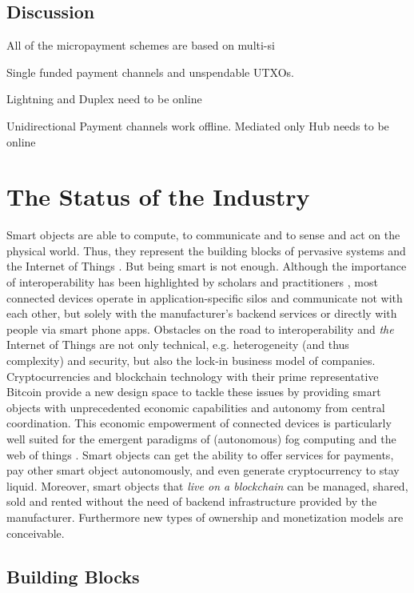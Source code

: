 \section{Discussion}

All of the micropayment schemes are based on multi-si

Single funded payment channels and unspendable UTXOs.

Lightning and Duplex need to be online 

Unidirectional Payment channels work offline. Mediated only Hub needs to be online 




\chapter{The Status of the Industry}
\label{sec:economy}

Smart objects are able to compute, to communicate and to sense and act on the physical world. Thus, they represent the building blocks of pervasive systems and the Internet of Things \cite{kortuem2010smart}. But being smart is not enough. Although the importance of interoperability has been highlighted by scholars \cite{zorzi2010} and practitioners \cite{manyika2015unlocking}, most connected devices operate in application-specific silos and communicate not with each other, but solely with the manufacturer's backend services or directly with people via smart phone apps.
Obstacles on the road to interoperability and \textit{the} Internet of Things are not only technical, e.g. heterogeneity (and thus complexity) and security, but also the lock-in business model of companies.
Cryptocurrencies and blockchain technology with their prime representative Bitcoin provide a new design space to tackle these issues by providing smart objects with unprecedented economic capabilities and autonomy from central coordination. This economic empowerment of connected devices is particularly well suited for the emergent paradigms of (autonomous) fog computing \cite{Bonomi:2012:FCR:2342509.2342513} and the web of things . Smart objects can get the ability to offer services for payments, pay other smart object autonomously, and even generate cryptocurrency to stay liquid. Moreover, smart objects that \textit{live on a blockchain} can be managed, shared, sold and rented without the need of backend infrastructure provided by the manufacturer. Furthermore new types of ownership and monetization models are conceivable.


\section{Building Blocks}


